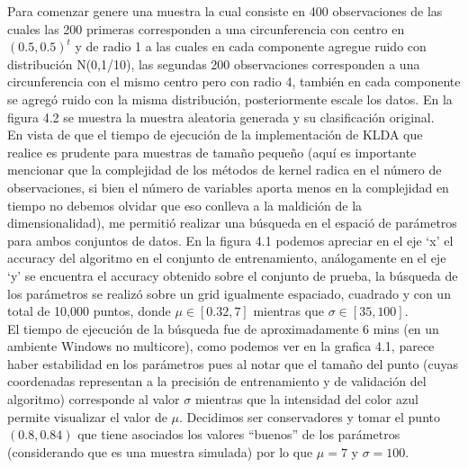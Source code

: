 \documentclass[paper=letter, fontsize=11pt]{scrartcl}
\numberwithin{equation}{section} %
\numberwithin{figure}{section} %
\numberwithin{table}{section} %
\begin{document}
Para comenzar genere una muestra la cual consiste en 400 observaciones de las cuales las 200 primeras corresponden a una circunferencia con centro en $(0.5,0 .5)^t$ y de radio 1 a las cuales en cada componente agregue ruido con distribución N(0,1/10), las segundas 200 observaciones corresponden a una circunferencia con el mismo centro pero con radio 4, también en cada componente se agregó ruido con la misma distribución, posteriormente escale los datos. En la figura 4.2 se muestra la muestra aleatoria generada y su clasificación original.\\  
En vista de que el tiempo de ejecución de la implementación de KLDA que realice es prudente para muestras de tamaño pequeño (aquí es importante mencionar que la complejidad de los métodos de kernel radica en el número de observaciones, si bien el número de variables aporta menos en la complejidad en tiempo no debemos olvidar que eso conlleva a la maldición de la dimensionalidad), me permitió realizar una búsqueda en el espació de parámetros para ambos conjuntos de datos. En la figura 4.1 podemos apreciar en el eje ‘x’ el accuracy del algoritmo en el conjunto de entrenamiento, análogamente en el eje ‘y’ se encuentra el accuracy obtenido sobre el conjunto de prueba, la búsqueda de los parámetros se realizó sobre un grid igualmente espaciado, cuadrado y con un total de 10,000 puntos, donde  $\mu \in [0.32, 7]$ mientras que $\sigma \in [35, 100]$.   \\

El tiempo de ejecución de la búsqueda fue de aproximadamente 6 mins (en un ambiente Windows no multicore), como podemos ver en la grafica 4.1, parece haber estabilidad en los parámetros pues al notar que el tamaño del punto (cuyas coordenadas representan a la precisión de entrenamiento y de validación del algoritmo) corresponde al valor $\sigma$ mientras que la intensidad del color azul permite visualizar el valor de $\mu$. Decidimos ser conservadores y tomar el punto $(0.8, 0.84 )$ que tiene asociados los valores “buenos” de los parámetros (considerando que es una muestra simulada) por lo que $\mu = 7$ y $\sigma=100$.
\end{document}
